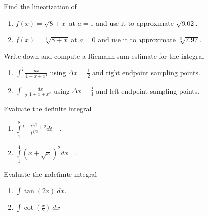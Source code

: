 \documentclass{article}
\begin{document}
\begin{problem}
Find the linearization of
\begin{enumerate}
\item $f(x)=\sqrt{8+x}$ at $a=1$ and use it to approximate $\sqrt{9.02}$.

\item $f(x)=\sqrt[3]{8+x}$ at $a=0$ and use it to approximate $\sqrt[3] {7.97}$.

\end{enumerate}
\end{problem}
\begin{problem}
Write down and compute a Riemann sum estimate for the integral 
\begin{enumerate}
\item $\displaystyle\int_{0}^2 \frac{dx}{1+x+x^3}$ using $\Delta x=\frac{1}2 $ and right endpoint sampling points.
\item $\displaystyle\int_{-2}^{0} \frac{dx}{1+x+x^2}$ using $\Delta x=\frac23 $ and left endpoint sampling points.

\end{enumerate}
\end{problem}

\begin{problem}
Evaluate the definite integral 
\begin{enumerate}
\item $\displaystyle\int\limits_{1}^{8} \frac{t-t^{1/3}+2}{t^{4/3}} dt\quad .$
\item $\displaystyle\int\limits_{1}^{4} (x+\sqrt{x})^2 dx\quad .$
\end{enumerate}
\end{problem}

\begin{problem}
Evaluate the indefinite integral 
\begin{enumerate}
\item $\displaystyle\int \tan (2x) ~dx$.
\item $\displaystyle \int \cot \left(\frac{x}{2}\right)~dx$
\end{enumerate}
\end{problem}
\end{document}
